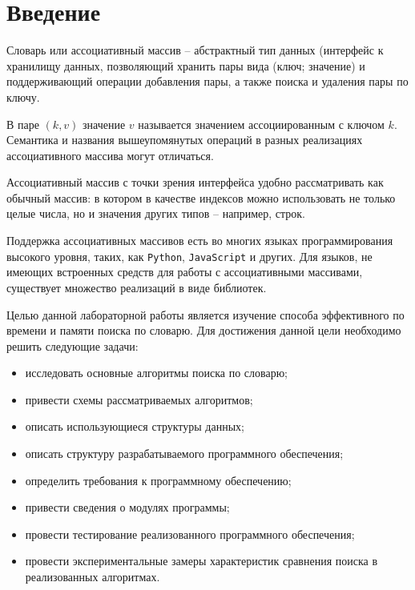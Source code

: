 \chapter*{Введение}

Словарь или ассоциативный массив -- абстрактный тип данных (интерфейс к хранилищу данных, позволяющий хранить пары вида (ключ; значение) и поддерживающий операции добавления пары, а также поиска и удаления пары по ключу.

В паре $(k,v)$ значение $v$ называется значением ассоциированным с ключом $k$. Семантика и названия вышеупомянутых операций в разных реализациях ассоциативного массива могут отличаться.

Ассоциативный массив с точки зрения интерфейса удобно рассматривать как обычный массив: в котором в качестве индексов можно использовать не только целые числа, но и значения других типов -- например, строк.

Поддержка ассоциативных массивов есть во многих языках программирования высокого уровня, таких, как \texttt{Python}, \texttt{JavaScript} и других. Для языков, не имеющих встроенных средств для работы с ассоциативными массивами, существует множество реализаций в виде библиотек.

Целью данной лабораторной работы является изучение способа эффективного по времени и памяти поиска по словарю. Для достижения данной цели необходимо решить следующие задачи:

\begin{itemize}
	\item исследовать основные алгоритмы поиска по словарю;
	\item привести схемы рассматриваемых алгоритмов;
	\item описать использующиеся структуры данных;
	\item описать структуру разрабатываемого программного обеспечения;
	\item определить требования к программному обеспечению;
	\item привести сведения о модулях программы;
	\item провести тестирование реализованного программного обеспечения;
	\item провести экспериментальные замеры характеристик сравнения поиска в реализованных алгоритмах.
\end{itemize}